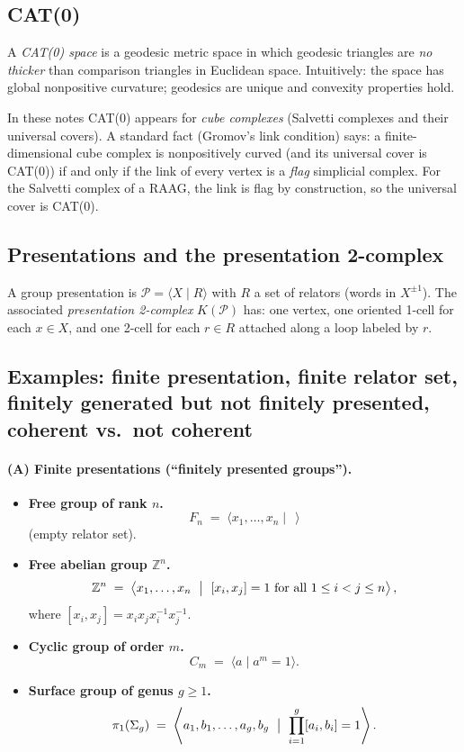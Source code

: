 \documentclass[11pt]{article}
\theoremstyle{definition}
\theoremstyle{plain}
\theoremstyle{remark}
\begin{document}
\subsection{CAT(0) }
A \emph{CAT(0) space} is a geodesic metric space in which geodesic triangles are \emph{no thicker} than comparison triangles in Euclidean space.
Intuitively: the space has global nonpositive curvature; geodesics are unique and convexity properties hold.

In these notes CAT(0) appears for \emph{cube complexes} (Salvetti complexes and their universal covers).
A standard fact (Gromov's link condition) says: a finite-dimensional cube complex is nonpositively curved (and its universal cover is CAT(0))
if and only if the link of every vertex is a \emph{flag} simplicial complex. For the Salvetti complex of a RAAG, the link is flag by construction,
so the universal cover is CAT(0).\cite{bridsonhaefliger1999,gromov1987}

\subsection{Presentations and the presentation 2-complex}
A group presentation is $\mathcal P=\langle X\mid R\rangle$ with $R$ a set of relators (words in $X^{\pm1}$).
The associated \emph{presentation 2-complex} $K(\mathcal P)$ has:
one vertex, one oriented 1-cell for each $x\in X$, and one 2-cell for each $r\in R$ attached along a loop labeled by $r$.


\subsection*{Examples: finite presentation, finite relator set, finitely generated but not finitely presented,
coherent vs.\ not coherent}

\paragraph{(A) Finite presentations (``finitely presented groups'').}
\begin{itemize}[leftmargin=2em]
\item \textbf{Free group of rank $n$.}
\[
F_n \;=\; \langle x_1,\dots,x_n \mid \ \ \rangle
\]
(empty relator set).

\item \textbf{Free abelian group $\mathbb Z^n$.}
\[
\mathbb Z^n \;=\; \left\langle x_1,\dots,x_n \ \bigm|\ [x_i,x_j]=1\ \text{for all }1\le i<j\le n \right\rangle,
\]
where $[x_i,x_j]=x_ix_jx_i^{-1}x_j^{-1}$.

\item \textbf{Cyclic group of order $m$.}
\[
C_m \;=\; \langle a \mid a^m=1\rangle.
\]

\item \textbf{Surface group of genus $g\ge 1$.}
\[
\pi_1(\Sigma_g)\;=\;\left\langle a_1,b_1,\dots,a_g,b_g \ \bigm|\ \prod_{i=1}^g [a_i,b_i]=1 \right\rangle.
\]
\end{itemize}
\end{document}
